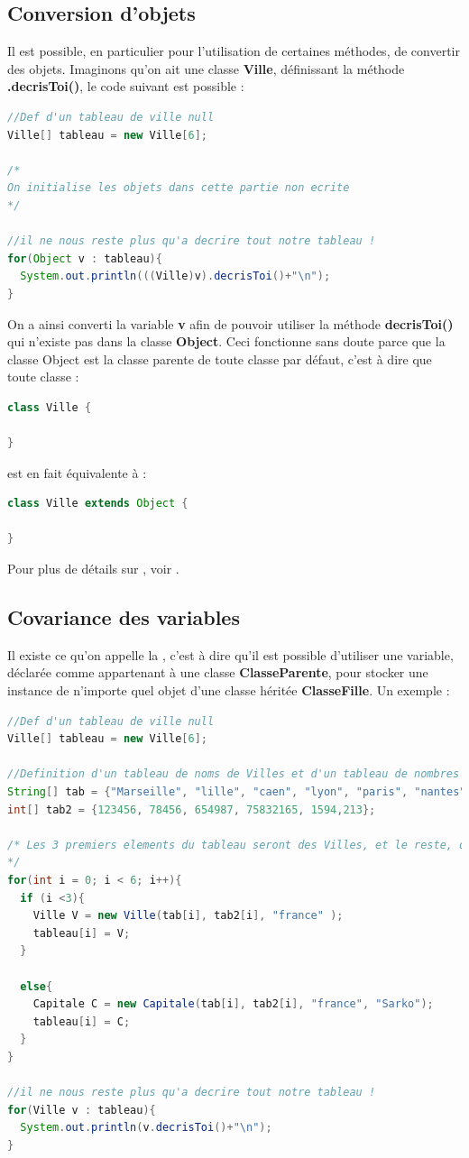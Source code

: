 \documentclass[a4paper,twoside]{article}
\begin{document}
\subsection{Conversion d'objets}
Il est possible, en particulier pour l'utilisation de certaines méthodes, de convertir des objets. Imaginons qu'on ait une classe \textbf{Ville}, définissant la méthode \textbf{.decrisToi()}, le code suivant est possible :
\begin{lstlisting}[language=java]
//Def d'un tableau de ville null
Ville[] tableau = new Ville[6];

/*
On initialise les objets dans cette partie non ecrite
*/

//il ne nous reste plus qu'a decrire tout notre tableau !
for(Object v : tableau){
  System.out.println(((Ville)v).decrisToi()+"\n");
}
\end{lstlisting}
On a ainsi converti la variable \textbf{v} afin de pouvoir utiliser la méthode \textbf{decrisToi()} qui n'existe pas dans la classe \textbf{Object}. Ceci fonctionne sans doute parce que la classe Object est la classe parente de toute classe par défaut, c'est à dire que toute classe :
\begin{lstlisting}[language=java]
class Ville {

}
\end{lstlisting}
est en fait équivalente à :
\begin{lstlisting}[language=java]
class Ville extends Object {

}
\end{lstlisting}

Pour plus de détails sur , voir .

\subsection{Covariance des variables}
Il existe ce qu'on appelle la , c'est à dire qu'il est possible d'utiliser une variable, déclarée comme appartenant à une classe \textbf{ClasseParente}, pour stocker une instance de n'importe quel objet d'une classe héritée \textbf{ClasseFille}. Un exemple :
\begin{lstlisting}[language=java]
//Def d'un tableau de ville null
Ville[] tableau = new Ville[6];
    
//Definition d'un tableau de noms de Villes et d'un tableau de nombres d'habitants
String[] tab = {"Marseille", "lille", "caen", "lyon", "paris", "nantes"};
int[] tab2 = {123456, 78456, 654987, 75832165, 1594,213};

/* Les 3 premiers elements du tableau seront des Villes, et le reste, des capitales
*/
for(int i = 0; i < 6; i++){
  if (i <3){
    Ville V = new Ville(tab[i], tab2[i], "france" );
    tableau[i] = V;
  }

  else{
    Capitale C = new Capitale(tab[i], tab2[i], "france", "Sarko");
    tableau[i] = C;
  }
}

//il ne nous reste plus qu'a decrire tout notre tableau !
for(Ville v : tableau){
  System.out.println(v.decrisToi()+"\n");
}
\end{lstlisting}
\end{document}
